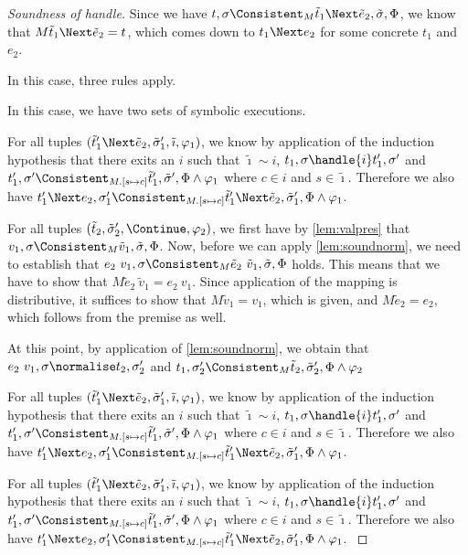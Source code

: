 \begin{proof}[Soundness of handle]
 {
Since we have $t,\sigma\Consistent_M\tilde{t}_1\Next \tilde{e}_2,\tilde{\sigma},\Phi$, we know that $M \tilde{t}_1\Next \tilde{e}_2=t$, which comes down to $t_1\Next e_2$ for some concrete $t_1$ and $e_2$.

 In this case, three rules apply.\\


{
In this case, we have two sets of symbolic executions.

For all tuples $(\tilde{t}_1'\Next \tilde{e}_2,\tilde{\sigma}_1',\tilde{\imath},\phi_1)$, we know by application of the induction hypothesis that
there exits an $i$ such that $\tilde{\imath}\sim i$, $t_1,\sigma\handle{i}t_1',\sigma'$ and
$t_1',\sigma'\Consistent_{M.[s\mapsto c]}\tilde{t}_1',\tilde{\sigma}',\Phi\land\phi_1$ where $c\in i$ and $s\in \tilde{\imath}$.
Therefore we also have $t_1'\Next e_2,\sigma_1'\Consistent_{M.[s\mapsto c]}\tilde{t}_1'\Next \tilde{e}_2,\tilde{\sigma}_1',\Phi\land\phi_1$.

For all tuples $(\tilde{t}_2,\tilde{\sigma}_2',\Continue,\phi_2)$, we first have by \cref{lem:valpres} that
$v_1,\sigma\Consistent_M\tilde{v}_1,\tilde{\sigma},\Phi$.
Now, before we can apply \cref{lem:soundnorm}, we need to establish that
$e_2\ v_1,\sigma\Consistent_M\tilde{e}_2\ \tilde{v}_1,\tilde{\sigma},\Phi$ holds.
This means that we have to show that $M \tilde{e}_2\ \tilde{v}_1 = e_2\ v_1$.
Since application of the mapping is distributive, it suffices to show that $M\tilde{v}_1=v_1$, which is given,
and $M\tilde{e}_2=e_2$, which follows from the premise as well.

At this point, by application of \cref{lem:soundnorm}, we obtain that $e_2\ v_1,\sigma\normalise t_2,\sigma_2'$
and $t_1,\sigma_2'\Consistent_M\tilde{t}_2,\tilde{\sigma}_2',\Phi\land\phi_2$
}
%
{
For all tuples $(\tilde{t}_1'\Next \tilde{e}_2,\tilde{\sigma}_1',\tilde{\imath},\phi_1)$, we know by application of the induction hypothesis that
there exits an $i$ such that $\tilde{\imath}\sim i$, $t_1,\sigma\handle{i}t_1',\sigma'$ and
$t_1',\sigma'\Consistent_{M.[s\mapsto c]}\tilde{t}_1',\tilde{\sigma}',\Phi\land\phi_1$ where $c\in i$ and $s\in \tilde{\imath}$.
Therefore we also have $t_1'\Next e_2,\sigma_1'\Consistent_{M.[s\mapsto c]}\tilde{t}_1'\Next \tilde{e}_2,\tilde{\sigma}_1',\Phi\land\phi_1$.
}

{
For all tuples $(\tilde{t}_1'\Next \tilde{e}_2,\tilde{\sigma}_1',\tilde{\imath},\phi_1)$, we know by application of the induction hypothesis that
there exits an $i$ such that $\tilde{\imath}\sim i$, $t_1,\sigma\handle{i}t_1',\sigma'$ and
$t_1',\sigma'\Consistent_{M.[s\mapsto c]}\tilde{t}_1',\tilde{\sigma}',\Phi\land\phi_1$ where $c\in i$ and $s\in \tilde{\imath}$.
Therefore we also have $t_1'\Next e_2,\sigma_1'\Consistent_{M.[s\mapsto c]}\tilde{t}_1'\Next \tilde{e}_2,\tilde{\sigma}_1',\Phi\land\phi_1$.
}
}


\end{proof}
